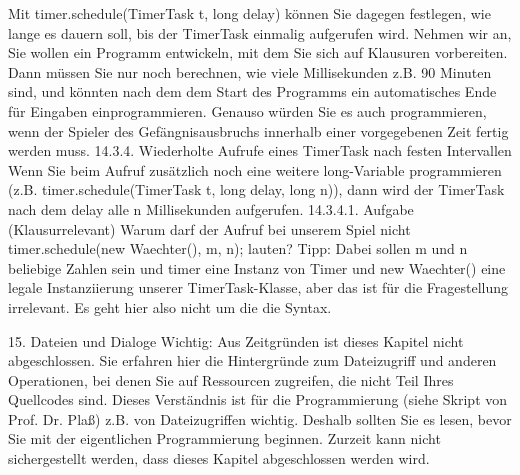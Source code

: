 Mit timer.schedule(TimerTask t, long delay) können Sie dagegen festlegen, wie lange es dauern soll, bis der TimerTask einmalig aufgerufen wird. Nehmen wir an, Sie wollen ein Programm entwickeln, mit dem Sie sich auf Klausuren vorbereiten. Dann müssen Sie nur noch berechnen, wie viele Millisekunden z.B. 90 Minuten sind, und könnten nach dem dem Start des Programms ein automatisches Ende für Eingaben einprogrammieren. Genauso würden Sie es auch programmieren, wenn der Spieler des Gefängnisausbruchs innerhalb einer vorgegebenen Zeit fertig werden muss.
14.3.4.	Wiederholte Aufrufe eines TimerTask nach festen Intervallen
Wenn Sie beim Aufruf zusätzlich noch eine weitere long-Variable programmieren (z.B. timer.schedule(TimerTask t, long delay, long n)), dann wird der TimerTask nach dem delay alle n Millisekunden aufgerufen.
14.3.4.1.	Aufgabe (Klausurrelevant)
Warum darf der Aufruf bei unserem Spiel nicht timer.schedule(new Waechter(), m, n); lauten?
Tipp: Dabei sollen m und n beliebige Zahlen sein und timer eine Instanz von Timer und new Waechter() eine legale Instanziierung unserer TimerTask-Klasse, aber das ist für die Fragestellung irrelevant. Es geht hier also nicht um die die Syntax. 


15.	Dateien und Dialoge
Wichtig: Aus Zeitgründen ist dieses Kapitel nicht abgeschlossen. Sie erfahren hier die Hintergründe zum Dateizugriff und anderen Operationen, bei denen Sie auf Ressourcen zugreifen, die nicht Teil Ihres Quellcodes sind. Dieses Verständnis ist für die Programmierung (siehe Skript von Prof. Dr. Plaß) z.B. von Dateizugriffen wichtig. Deshalb sollten Sie es lesen, bevor Sie mit der eigentlichen Programmierung beginnen. Zurzeit kann nicht sichergestellt werden, dass dieses Kapitel abgeschlossen werden wird.

